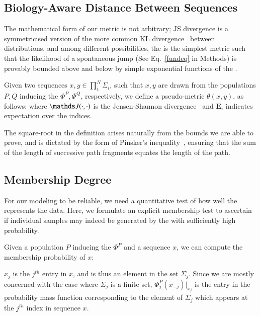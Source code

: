 {\subsection*{Biology-Aware Distance Between Sequences}
The mathematical form of our metric is not arbitrary; JS divergence is a symmetricised version of the more common KL divergence~\cite{cover} between distributions, and among  different possibilities, the \qdist  is the simplest metric such that the likelihood of a spontaneous jump (See Eq.~\eqref{fundeq} in Methods) is provably bounded above and below  by simple exponential functions of the \qdist.

\begin{defn}\label{defqdistance}
Given two sequences $x,y \in \prod_1^N\Sigma_i$, such that $x,y$ are drawn from the  populations $P,Q$  inducing the \enet $\Phi^P,\Phi^Q$, respectively,  we define a pseudo-metric $\theta(x,y) $, as follows:
where $ \J(\cdot,\cdot)$ is the Jensen-Shannon divergence~\cite{manning1999foundations} and $\mathbf{E}_i$ indicates expectation over the indices.
\end{defn}
The square-root in the definition arises naturally from the bounds we are able to prove, and is dictated by the form of Pinsker's inequality~\cite{cover}, ensuring that   the sum of the length of successive path fragments equates the length of the path.%


\subsection*{Membership Degree}

For our modeling to be reliable, we need a quantitative test of how well the \enet represents the data. Here, we formulate an explicit membership test to ascertain if individual samples may indeed be generated by the \enet with sufficiently high probability.
%
\begin{defn}\label{defmem}
Given a population $P$ inducing the \enet $\Phi^P$ and a sequence $x$, we can compute the membership probability of $x$:
\end{defn}
$x_j$ is the $j^{th}$ entry in $x$, and is thus an element in the set $\Sigma_j$. Since we are mostly concerned with the case where $\Sigma_j$ is a finite set, $\Phi^P_j(x_{-j}) \vert_{x_j}$ is the entry in the probability mass function corresponding to the element of $\Sigma_j$ which appears at the  $j^{th}$ index in sequence $x$. 
 
}

